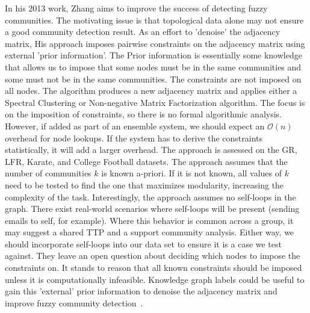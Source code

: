 \par{In his 2013 work, Zhang aims to improve the success of detecting fuzzy communities. The motivating issue is that topological data alone may not ensure a good community detection result. As an effort to 'denoise' the adjacency matrix, His approach imposes pairwise constraints on the adjacency matrix using external 'prior information'. The Prior information is essentially some knowledge that allows us to impose that some nodes must be in the same communities and some must not be in the same communities. The constraints are not imposed on all nodes. The algorithm produces a new adjacency matrix and applies either a Spectral Clustering or Non-negative Matrix Factorization algorithm. The focus is on the imposition of constraints, so there is no formal algorithmic analysis. However, if added as part of an ensemble system, we should expect an $\mathcal{O}(n)$ overhead for node lookups. If the system has to derive the constraints statistically, it will add a larger overhead. The approach is assessed on the GR, LFR, Karate, and College Football datasets. The approach assumes that the number of communities $k$ is known a-priori. If it is not known, all values of $k$ need to be tested to find the one that maximizes modularity, increasing the complexity of the task. Interestingly, the approach assumes no self-loops in the graph. There exist real-world scenarios where self-loops will be present (sending emails to self, for example). Where this behavior is common across a group, it may suggest a shared TTP and a support community analysis. Either way, we should incorporate self-loops into our data set to ensure it is a case we test against. They leave an open question about deciding which nodes to impose the constraints on. It stands to reason that all known constraints should be imposed unless it is computationally infeasible. Knowledge graph labels could be useful to gain this 'external' prior information to denoise the adjacency matrix and improve fuzzy community detection~\cite{Zhang2013}.}

